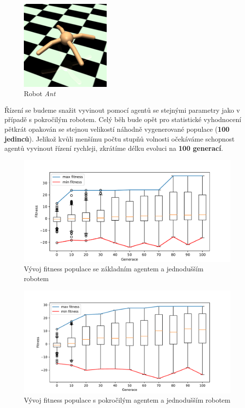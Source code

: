 \begin{figure}[!htb]
    \centering
    \includegraphics[width=0.4\textwidth]{../img/crop_Ant-v3.jpg}
    \caption{Robot \emph{Ant}}
    \label{fig:robot:ant}
\end{figure}

Řízení se budeme snažit vyvinout pomocí agentů se stejnými parametry jako v
případě s pokročilým robotem. Celý běh bude opět pro statistické vyhodnocení
pětkrát opakován se stejnou velikostí náhodně vygenerované populace
(\textbf{100 jedinců}). Jelikož kvůli menšímu počtu stupňů volnosti očekáváme
schopnost agentů vyvinout řízení rychleji, zkrátíme délku evoluci na
\textbf{100 generací}.

\begin{figure}[h!]
    \centering
    \includegraphics[width=1\textwidth]{../img/experiment1_2_Sine_10ticks.pdf}
    \caption{Vývoj fitness populace se základním agentem a jednodušším robotem}
    \label{exp:first2_sinefull}
\end{figure}
\begin{figure}[h!]
    \includegraphics[width=1\textwidth]{../img/experiment1_2_TFS_10ticks.pdf}
    \caption{Vývoj fitness populace s pokročilým agentem a jednodušším robotem}
    \label{exp:first2_TFS}
\end{figure}

